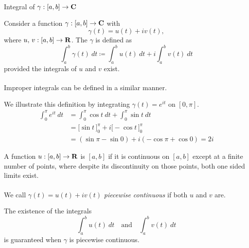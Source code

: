 \vspace*{1em}

\begin{mdframed}
\begin{center}
{\Large Integral of $\gamma:[a,b] \to \mathbf C$}
\end{center}
\end{mdframed}

\begin{definition}
Consider a function $\gamma:[a,b] \to \mathbf C$ with \[\gamma(t) = u(t) + iv(t),\] where $u,\,v: [a,b] \to \mathbf R$. The  {\color{blue}$\gamma$} is defined as
\[\int_a^b\gamma(t)\ dt \coloneqq \int_a^bu(t)\ dt + i\int_a^bv(t)\ dt\]
provided the integrals of $u$ and $v$ exist.\\
\\
Improper integrals can be defined in a similar manner.
\end{definition}

\vspace*{1em}

\begin{example}
We illustrate this definition by integrating $\gamma(t) = e^{it}$ on $[0,\pi]$.
\begin{align*}
\int_0^\pi e^{it}\ dt &= \int_0^\pi\cos t\ dt + \int_0^\pi\sin t\ dt\\[1em]
&= \Big[\sin t\,\Big]_0^\pi + i\Big[-\cos t\,\Big]_0^\pi\\[1em]
&= (\sin \pi - \sin 0) + i(-\cos\pi + \cos 0) = 2i
\end{align*}
\end{example}

\vspace*{1em}

\begin{definition}
A function $u:[a,b] \to \mathbf R$ is  {\color{blue}$[a,b]$} if it is continuous on $[a,b]$ except at a finite number of points, where despite its discontinuity on those points, both one sided limits exist.\\
\\
We call $\gamma(t) = u(t) + iv(t)$ \emph{piecewise continuous} if both $u$ and $v$ are. 
\end{definition}

\vspace*{1em}

\begin{remark}
The existence of the integrals 
\[\int_a^bu(t)\ dt \quad \text{and} \quad \int_a^b v(t)\ dt\]
is guaranteed when $\gamma$ is piecewise continuous.
\end{remark}

